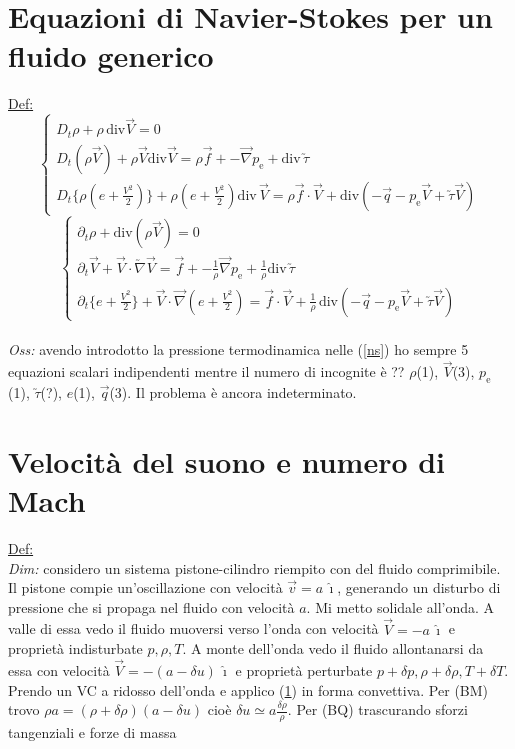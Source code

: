\documentclass[11pt,a4paper]{report}
\newcommand{\sz}[1]{\scriptsize #1\normalsize}
\begin{document}
	\section{Equazioni di Navier-Stokes per un fluido generico} \label{ns fluido}
	\underline{Def:}$$\begin{cases}
	D_t\rho+\rho\,\mathrm{div}\vec V=0\\
	D_t(\rho\vec V)+\rho\vec V\mathrm{div}\vec V=\rho\vec f+-\vec\nabla p_\mathrm e+\mathrm{div}\,\utilde\tau\\
	D_t\{\rho(e+\frac{V^2}{2})\}+\rho(e+\frac{V^2}{2})\mathrm{div}\,\vec V=\rho\vec f\cdot\vec V+\mathrm{div}(-\vec q-p_\mathrm e\vec V+\utilde\tau\vec V)
	\end{cases}$$
	$$\begin{cases}
	\partial_t\rho+\mathrm{div}(\rho\vec V)=0\\
	\partial_t\vec V+\vec V\cdot\utilde\nabla\vec V=\vec f+-\frac 1\rho\vec\nabla p_\mathrm e+\frac 1\rho\mathrm{div}\,\utilde\tau\\
	\partial_t\{e+\frac{V^2}{2}\}+\vec V\cdot\vec\nabla(e+\frac{V^2}{2})=\vec f\cdot\vec V+\frac 1\rho\,\mathrm{div}(-\vec q-p_\mathrm e\vec V+\utilde\tau\vec V)
	\end{cases}$$\\
    \textit{Oss:} avendo introdotto la pressione termodinamica nelle (\ref{ns}) ho sempre 5 equazioni scalari indipendenti mentre il numero di incognite è ?? $\rho$(1), $\vec V$(3), $p_\mathrm e$(1), $\utilde\tau$(?), $e$(1), $\vec q$(3). Il problema è ancora indeterminato.
    
	\section{Velocità del suono e numero di Mach}
	\underline{Def:} \\
	\textit{Dim:} considero un sistema pistone-cilindro riempito con del fluido comprimibile. Il pistone compie un'oscillazione con velocità $\vec v=a\,\hat\imath$, generando un disturbo di pressione che si propaga nel fluido con velocità $a$. Mi metto solidale all'onda. A valle di essa vedo il fluido muoversi verso l'onda con velocità $\vec V=-a\,\hat\imath$ e proprietà indisturbate $p,\rho,T$. A monte dell'onda vedo il fluido allontanarsi da essa con velocità $\vec V=-(a-\delta u)\,\hat\imath$ e proprietà perturbate $p+\delta p,\rho+\delta\rho,T+\delta T$. Prendo un VC a ridosso dell'onda e applico (\ref{ns fluido}) in forma convettiva. Per \sz{(BM)  } trovo $\rho a=(\rho+\delta\rho)(a-\delta u)$ cioè $\delta u\simeq a\frac{\delta\rho}\rho$. Per \sz{(BQ)  } trascurando sforzi tangenziali e forze di massa
    
\end{document}

